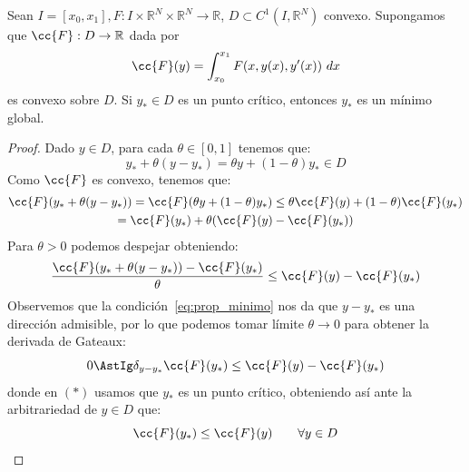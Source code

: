 \begin{prop}
    Sean $I=[x_0,x_1], F:I\times\mathbb{R}^N\times\mathbb{R}^N\to \mathbb{R}$, $D\subset C^1(I,\mathbb{R}^N)$ convexo. Supongamos que $\cc{F}:D\to \mathbb{R}$ dada por
    \begin{equation*}
        \cc{F}(y) = \int_{x_0}^{x_1} F(x,y(x),y'(x))~dx 
    \end{equation*}
    es convexo sobre $D$. Si $y_\ast\in D$ es un punto crítico, entonces $y_\ast$ es un mínimo global.
    \begin{proof}
        Dado $y\in D$, para cada $\theta \in [0,1]$ tenemos que:
        \begin{equation}\label{eq:prop_minimo}
            y_\ast + \theta(y-y_\ast) = \theta y + (1-\theta)y_\ast \in D 
        \end{equation}
        Como $\cc{F}$ es convexo, tenemos que:
        \begin{multline*}
            \cc{F}(y_\ast + \theta(y-y_\ast))= \cc{F}(\theta y + (1-\theta)y_\ast) \leq \theta \cc{F}(y) + (1-\theta)\cc{F}(y_\ast) \\
            = \cc{F}(y_\ast) + \theta(\cc{F}(y) - \cc{F}(y_\ast))
        \end{multline*}
        Para $\theta > 0$ podemos despejar obteniendo:
        \begin{equation*}
            \frac{\cc{F}(y_\ast + \theta(y-y_\ast)) - \cc{F}(y_\ast)}{\theta} \leq \cc{F}(y) - \cc{F}(y_\ast)
        \end{equation*}
        Observemos que la condición~\eqref{eq:prop_minimo} nos da que $y-y_\ast$ es una dirección admisible, por lo que podemos tomar límite $\theta\to 0$ para obtener la derivada de Gateaux:
        \begin{equation*}
            0 \AstIg \delta_{y-y_\ast}\cc{F}(y_\ast) \leq \cc{F}(y) - \cc{F}(y_\ast)
        \end{equation*}
        donde en $(\ast)$ usamos que $y_\ast$ es un punto crítico, obteniendo así ante la arbitrariedad de $y\in D$ que:
        \begin{equation*}
            \cc{F}(y_\ast) \leq \cc{F}(y) \qquad \forall y\in D
        \end{equation*}
    \end{proof}
\end{prop}

